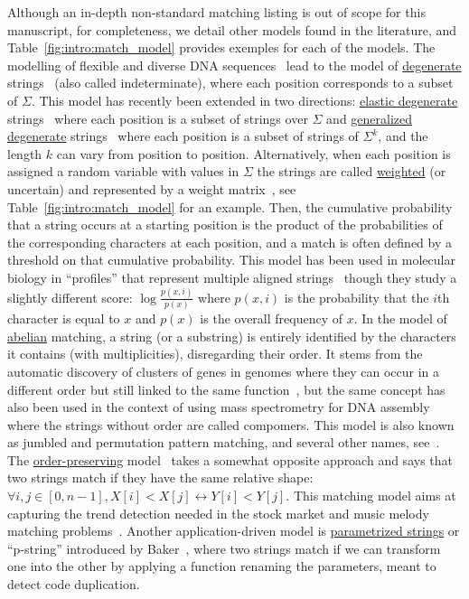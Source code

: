 Although an in-depth non-standard matching listing is out of scope for this manuscript, for completeness, we detail other models found in the literature, and Table~\ref{fig:intro:match_model} provides exemples for each of the models.
The modelling of flexible and diverse DNA sequences~\cite{comm1970iupac} lead to the model of \underline{degenerate} strings~\cite{abrahamson1987generalized} (also called indeterminate), where each position corresponds to a subset of $\Sigma$.
This model has recently been extended in two directions: \underline{elastic degenerate} strings~\cite{iliopoulos2021efficient} where each position is a subset of strings over $\Sigma$ and \underline{generalized degenerate} strings~\cite{alzamel_et_al:LIPIcs:2018:9323} where each position is a subset of strings of $\Sigma^k$, and the length $k$ can vary from position to position.
Alternatively, when each position is assigned a random variable with values in $\Sigma$ the strings are called \underline{weighted} (or uncertain) and represented by a weight matrix~\cite{thompson1994clustal}, see Table~\ref{fig:intro:match_model} for an example. Then, the cumulative probability that a string occurs at a starting position is the product of the probabilities of the corresponding characters at each position, and a match is often defined by a threshold on that cumulative probability. This model has been used in molecular biology in ``profiles'' that represent multiple aligned strings~\cite{doi:10.1073/pnas.84.13.4355} though they study a slightly different score: $\log \frac{p(x,i)}{p(x)}$ where $p(x,i)$ is the probability that the $i$th character is equal to $x$ and $p(x)$ is the overall frequency of $x$. 
In the model of \underline{abelian} matching, a string (or a substring) is entirely identified by the characters it contains (with multiplicities), disregarding their order. It stems from the automatic discovery of clusters of genes in genomes where they can occur in a different order but still linked to the same function~\cite{eres2004permutation}, but the same concept has also been used in the context  of using mass spectrometry for DNA assembly~\cite{bocker2003sequencing} where the strings without order are called compomers. This model is also known as jumbled and permutation pattern matching, and several other names, see~\cite{ejaz2010abelian}.
The \underline{order-preserving} model~\cite{kim2014order,kubica2013linear} takes a somewhat opposite approach and says that two strings match if they have the same relative shape: $\forall i,j \in [0,n-1], X[i] < X[j] \leftrightarrow Y[i] < Y[j]$. This matching model aims at capturing the trend detection needed in the stock market and music melody matching problems~\cite{kim2014order}.
%
Another application-driven model is \underline{parametrized strings} or ``p-string'' introduced by Baker~\cite{baker1993theory}, where two strings match if we can transform one into the other by applying a function renaming the parameters, meant to detect code duplication.



